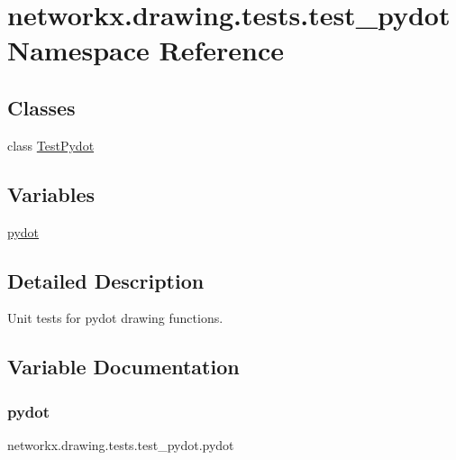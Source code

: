 \hypertarget{namespacenetworkx_1_1drawing_1_1tests_1_1test__pydot}{}\section{networkx.\+drawing.\+tests.\+test\+\_\+pydot Namespace Reference}
\label{namespacenetworkx_1_1drawing_1_1tests_1_1test__pydot}
\subsection*{Classes}
\begin{DoxyCompactItemize}
\item 
class \hyperlink{classnetworkx_1_1drawing_1_1tests_1_1test__pydot_1_1TestPydot}{Test\+Pydot}
\end{DoxyCompactItemize}
\subsection*{Variables}
\begin{DoxyCompactItemize}
\item 
\hyperlink{namespacenetworkx_1_1drawing_1_1tests_1_1test__pydot_acdfbbf74e1f1c80ba6584c4ac5a3afe2}{pydot}
\end{DoxyCompactItemize}


\subsection{Detailed Description}
\begin{DoxyVerb}Unit tests for pydot drawing functions.\end{DoxyVerb}
 

\subsection{Variable Documentation}
\mbox{\label{namespacenetworkx_1_1drawing_1_1tests_1_1test__pydot_acdfbbf74e1f1c80ba6584c4ac5a3afe2}} 
\subsubsection{\texorpdfstring{pydot}{pydot}}
{\footnotesize\ttfamily networkx.\+drawing.\+tests.\+test\+\_\+pydot.\+pydot}

